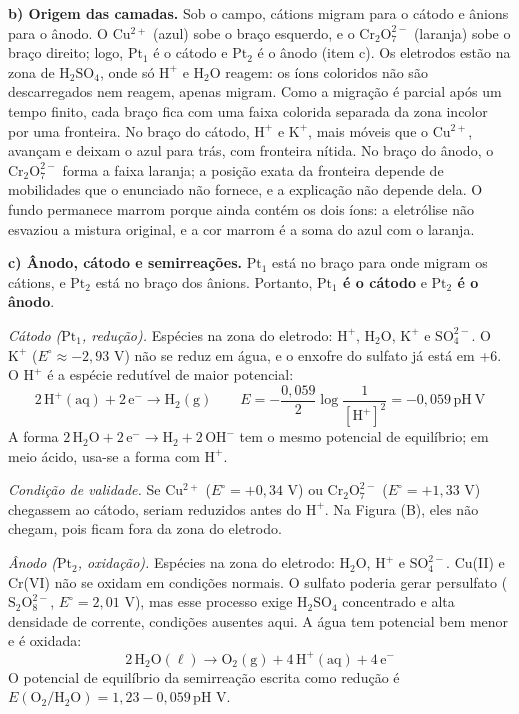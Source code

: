 \documentclass{article}%
\begin{document}
\textbf{b) Origem das camadas.} Sob o campo, cátions migram para o cátodo e ânions para o ânodo. O $\mathrm{Cu^{2+}}$ (azul) sobe o braço esquerdo, e o $\mathrm{Cr_2O_7^{2-}}$ (laranja) sobe o braço direito; logo, $\mathrm{Pt_1}$ é o cátodo e $\mathrm{Pt_2}$ é o ânodo (item c). Os eletrodos estão na zona de $\mathrm{H_2SO_4}$, onde só $\mathrm{H^+}$ e $\mathrm{H_2O}$ reagem: os íons coloridos não são descarregados nem reagem, apenas migram. Como a migração é parcial após um tempo finito, cada braço fica com uma faixa colorida separada da zona incolor por uma fronteira. No braço do cátodo, $\mathrm{H^+}$ e $\mathrm{K^+}$, mais móveis que o $\mathrm{Cu^{2+}}$, avançam e deixam o azul para trás, com fronteira nítida. No braço do ânodo, o $\mathrm{Cr_2O_7^{2-}}$ forma a faixa laranja; a posição exata da fronteira depende de mobilidades que o enunciado não fornece, e a explicação não depende dela. O fundo permanece marrom porque ainda contém os dois íons: a eletrólise não esvaziou a mistura original, e a cor marrom é a soma do azul com o laranja.

\textbf{c) Ânodo, cátodo e semirreações.} $\mathrm{Pt_1}$ está no braço para onde migram os cátions, e $\mathrm{Pt_2}$ está no braço dos ânions. Portanto, \textbf{$\mathrm{Pt_1}$ é o cátodo} e \textbf{$\mathrm{Pt_2}$ é o ânodo}.

\textit{Cátodo ($\mathrm{Pt_1}$, redução).} Espécies na zona do eletrodo: $\mathrm{H^+}$, $\mathrm{H_2O}$, $\mathrm{K^+}$ e $\mathrm{SO_4^{2-}}$. O $\mathrm{K^+}$ ($E^\circ\approx -2{,}93$ V) não se reduz em água, e o enxofre do sulfato já está em +6. O $\mathrm{H^+}$ é a espécie redutível de maior potencial:
\[
\mathrm{2\,H^+(aq) + 2\,e^- \rightarrow H_2(g)}\qquad E=-\frac{0{,}059}{2}\log\frac{1}{[\mathrm{H^+}]^2}=-0{,}059\,\mathrm{pH}\ \mathrm{V}
\]
A forma $\mathrm{2\,H_2O + 2\,e^- \rightarrow H_2 + 2\,OH^-}$ tem o mesmo potencial de equilíbrio; em meio ácido, usa-se a forma com $\mathrm{H^+}$.

\textit{Condição de validade.} Se $\mathrm{Cu^{2+}}$ ($E^\circ=+0{,}34$ V) ou $\mathrm{Cr_2O_7^{2-}}$ ($E^\circ=+1{,}33$ V) chegassem ao cátodo, seriam reduzidos antes do $\mathrm{H^+}$. Na Figura (B), eles não chegam, pois ficam fora da zona do eletrodo.

\textit{Ânodo ($\mathrm{Pt_2}$, oxidação).} Espécies na zona do eletrodo: $\mathrm{H_2O}$, $\mathrm{H^+}$ e $\mathrm{SO_4^{2-}}$. Cu(II) e Cr(VI) não se oxidam em condições normais. O sulfato poderia gerar persulfato ($\mathrm{S_2O_8^{2-}}$, $E^\circ=2{,}01$ V), mas esse processo exige $\mathrm{H_2SO_4}$ concentrado e alta densidade de corrente, condições ausentes aqui. A água tem potencial bem menor e é oxidada:
\[
\mathrm{2\,H_2O(\ell) \rightarrow O_2(g) + 4\,H^+(aq) + 4\,e^-}
\]
O potencial de equilíbrio da semirreação escrita como redução é $E(\mathrm{O_2/H_2O})=1{,}23-0{,}059\,\mathrm{pH}$ V.
\end{document}
